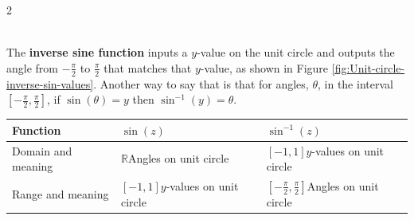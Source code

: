 \begin{multicols}{2}
	\begin{myDefinition}~\\[0.5mm]
		The \textbf{inverse sine function} inputs a $y$-value on the unit circle and outputs the angle from $-\frac{\pi}{2}$ to $\frac{\pi}{2}$ that matches that $y$-value, as shown in Figure \ref{fig:Unit-circle-inverse-sin-values}. Another way to say that is that for angles, $\theta$, in the interval $\left[-\frac{\pi}{2},\frac{\pi}{2}\right]$, if $\sin(\theta)=y$ then $\sin^{-1}(y)=\theta$.
		\begin{center}\captionsetup{type=table}\label{table:section-inverse-trig-definition-sine-inverse}
			\renewcommand{\arraystretch}{1.5}
			\begin{tabular}{|| p{2.3cm} | p{2.3cm} | p{2.3cm} ||}
				\hline
				Function			& $\sin(z)$										& $\sin^{-1}(z)$								\\
				\hline
				Domain and meaning	& $\mathbb{R}$\newline Angles on unit circle	& $[-1,1]$\newline $y$-values on unit circle	\\
				\hline
				Range and meaning	& $[-1,1]$\newline $y$-values on unit circle	& $\left[-\frac{\pi}{2},\frac{\pi}{2}\right]$\newline Angles on unit circle\\
				\hline
			\end{tabular}
		\end{center}
		\columnbreak
		\begin{center}
			\captionsetup{type=figure} 
\end{center}
\end{myDefinition}
\end{multicols}
